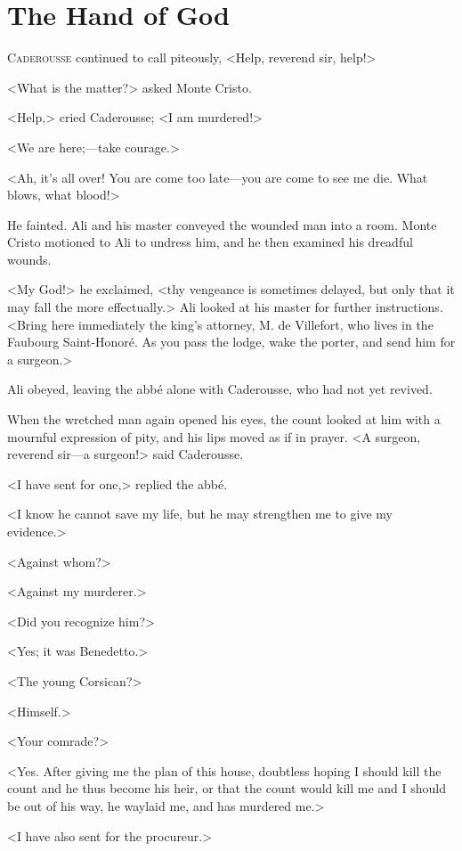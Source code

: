 \chapter{The Hand of God} 

 \lettrine{C}{aderousse} continued to call piteously, <Help, reverend sir, help!> 

 <What is the matter?> asked Monte Cristo. 

 <Help,> cried Caderousse; <I am murdered!> 

 <We are here;—take courage.> 

 <Ah, it's all over! You are come too late—you are come to see me die. What blows, what blood!> 

 He fainted. Ali and his master conveyed the wounded man into a room. Monte Cristo motioned to Ali to undress him, and he then examined his dreadful wounds. 

 <My God!> he exclaimed, <thy vengeance is sometimes delayed, but only that it may fall the more effectually.> Ali looked at his master for further instructions. <Bring here immediately the king's attorney, M. de Villefort, who lives in the Faubourg Saint-Honoré. As you pass the lodge, wake the porter, and send him for a surgeon.> 

 Ali obeyed, leaving the abbé alone with Caderousse, who had not yet revived. 

 When the wretched man again opened his eyes, the count looked at him with a mournful expression of pity, and his lips moved as if in prayer. <A surgeon, reverend sir—a surgeon!> said Caderousse. 

 <I have sent for one,> replied the abbé. 

 <I know he cannot save my life, but he may strengthen me to give my evidence.> 

 <Against whom?> 

 <Against my murderer.> 

 <Did you recognize him?> 

 <Yes; it was Benedetto.> 

 <The young Corsican?> 

 <Himself.> 

 <Your comrade?> 

 <Yes. After giving me the plan of this house, doubtless hoping I should kill the count and he thus become his heir, or that the count would kill me and I should be out of his way, he waylaid me, and has murdered me.> 

 <I have also sent for the procureur.> 

